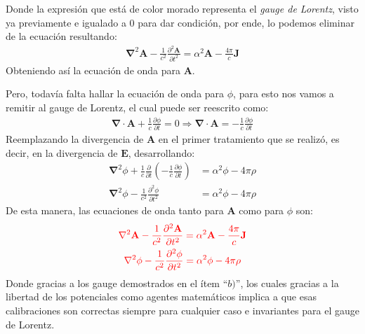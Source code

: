 \begin{multicols}{2}

Donde la expresión que está de color morado representa el \textit{gauge de Lorentz}, visto ya previamente e igualado a 0 para dar condición, por ende, lo podemos eliminar de la ecuación resultando:
\begin{align*}
    \mathbf{\nabla}^{2} \mathbf{A} - \frac{1}{c^{2}} \frac{\partial^{2} \mathbf{A}}{\partial t^{2}} = \alpha^{2} \mathbf{A} - \frac{4\pi}{c} \mathbf{J}
\end{align*}
Obteniendo así la ecuación de onda para $\mathbf{A}$.

Pero, todavía falta hallar la ecuación de onda para $\phi$, para esto nos vamos a remitir al gauge de Lorentz, el cual puede ser reescrito como:
\begin{align*}
    \mathbf{\nabla} \cdot \mathbf{A} + \frac{1}{c} \frac{\partial \phi}{\partial t} = 0 \Rightarrow \mathbf{\nabla} \cdot \mathbf{A} = - \frac{1}{c} \frac{\partial \phi}{\partial t}
\end{align*}
Reemplazando la divergencia de $\mathbf{A}$ en el primer tratamiento que se realizó, es decir, en la divergencia de $\mathbf{E}$, desarrollando:
\begin{align*}
    \mathbf{\nabla}^{2} \phi + \frac{1}{c} \frac{\partial}{\partial t} \left(- \frac{1}{c} \frac{\partial \phi}{\partial t}\right) &= \alpha^{2} \phi - 4\pi \rho\\
    \mathbf{\nabla}^{2} \phi - \frac{1}{c^{2}} \frac{\partial^{2} \phi}{\partial t^{2}} &= \alpha^{2} \phi - 4\pi \rho
\end{align*}
De esta manera, las ecuaciones de onda tanto para $\mathbf{A}$ como para $\phi$ son:
\begin{gather*}
    \textcolor{rojo}{\mathbf{\nabla}^{2} \mathbf{A} - \frac{1}{c^{2}} \frac{\partial^{2} \mathbf{A}}{\partial t^{2}} = \alpha^{2} \mathbf{A} - \frac{4\pi}{c} \mathbf{J}}\\
    \textcolor{rojo}{\mathbf{\nabla}^{2} \phi - \frac{1}{c^{2}} \frac{\partial^{2} \phi}{\partial t^{2}} = \alpha^{2} \phi - 4\pi \rho}
\end{gather*}
Donde gracias a los gauge demostrados en el ítem ``$b)$'', los cuales gracias a la libertad de los potenciales como agentes matemáticos implica a que esas calibraciones son correctas siempre para cualquier caso e invariantes para el gauge de Lorentz.





\end{multicols}



